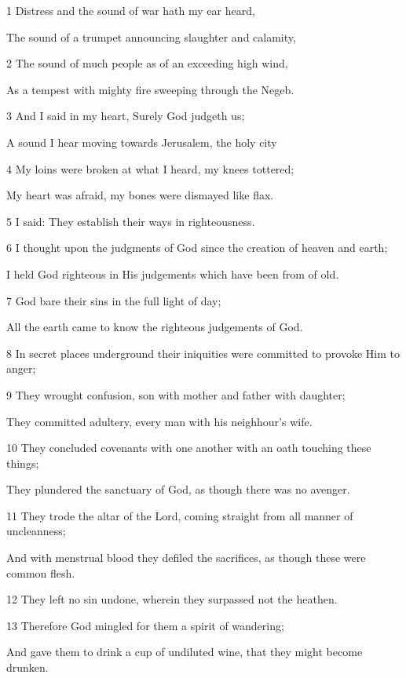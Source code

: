 \par 1 Distress and the sound of war hath my ear heard,
\par  The sound of a trumpet announcing slaughter and calamity,
\par 2 The sound of much people as of an exceeding high wind,
\par  As a tempest with mighty fire sweeping through the Negeb.
\par 3 And I said in my heart, Surely God judgeth us;
\par  A sound I hear moving towards Jerusalem, the holy city
\par 4 My loins were broken at what I heard, my knees tottered;
\par  My heart was afraid, my bones were dismayed like flax.
\par 5 I said: They establish their ways in righteousness.
\par    
\par 6 I thought upon the judgments of God since the creation of heaven and earth;
\par  I held God righteous in His judgements which have been from of old.
\par 7 God bare their sins in the full light of day;
\par  All the earth came to know the righteous judgements of God.
\par 8 In secret places underground their iniquities were committed to provoke Him to anger;
\par 9 They wrought confusion, son with mother and father with daughter;
\par  They committed adultery, every man with his neighhour's wife.
\par 10 They concluded covenants with one another with an oath touching these things;
\par  They plundered the sanctuary of God, as though there was no avenger.
\par 11 They trode the altar of the Lord, coming straight from all manner of uncleanness;
\par  And with menstrual blood they defiled the sacrifices, as though these were common flesh.
\par 12 They left no sin undone, wherein they surpassed not the heathen.
\par    
\par 13 Therefore God mingled for them a spirit of wandering;
\par  And gave them to drink a cup of undiluted wine, that they might become drunken.
